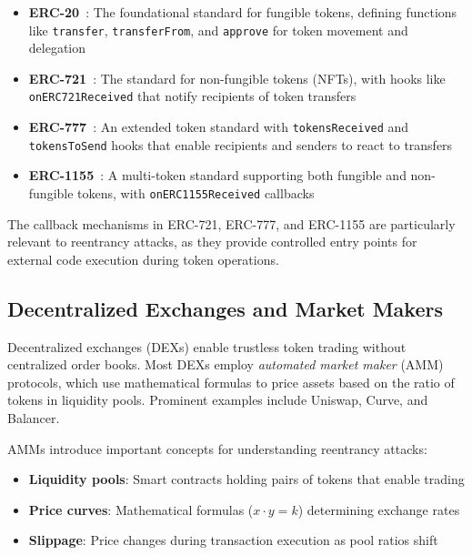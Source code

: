 \begin{itemize}
    \item \textbf{ERC-20}~\cite{erc20}: The foundational standard for fungible tokens, defining functions like \lstinline{transfer}, \lstinline{transferFrom}, and \lstinline{approve} for token movement and delegation

    \item \textbf{ERC-721}~\cite{erc721}: The standard for non-fungible tokens (NFTs), with hooks like \lstinline{onERC721Received} that notify recipients of token transfers

    \item \textbf{ERC-777}~\cite{erc777}: An extended token standard with \lstinline{tokensReceived} and \lstinline{tokensToSend} hooks that enable recipients and senders to react to transfers

    \item \textbf{ERC-1155}~\cite{erc1155}: A multi-token standard supporting both fungible and non-fungible tokens, with \lstinline{onERC1155Received} callbacks
\end{itemize}

The callback mechanisms in ERC-721, ERC-777, and ERC-1155 are particularly relevant to reentrancy attacks, as they provide controlled entry points for external code execution during token operations.

\subsection{Decentralized Exchanges and Market Makers}

Decentralized exchanges (DEXs) enable trustless token trading without centralized order books. Most DEXs employ \textit{automated market maker} (AMM) protocols, which use mathematical formulas to price assets based on the ratio of tokens in liquidity pools. Prominent examples include Uniswap, Curve, and Balancer.

AMMs introduce important concepts for understanding reentrancy attacks:
\begin{itemize}
    \item \textbf{Liquidity pools}: Smart contracts holding pairs of tokens that enable trading
    \item \textbf{Price curves}: Mathematical formulas (\eg $x \cdot y = k$) determining exchange rates
    \item \textbf{Slippage}: Price changes during transaction execution as pool ratios shift
\end{itemize}


